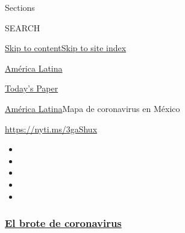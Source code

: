 Sections

SEARCH

\protect\hyperlink{site-content}{Skip to
content}\protect\hyperlink{site-index}{Skip to site index}

\href{https://www.nytimes3xbfgragh.onion/es/section/america-latina}{América
Latina}

\href{https://myaccount.nytimes3xbfgragh.onion/auth/login?response_type=cookie\&client_id=vi}{}

\href{https://www.nytimes3xbfgragh.onion/section/todayspaper}{Today's
Paper}

\href{/es/section/america-latina}{América Latina}\textbar{}Mapa de
coronavirus en México

\url{https://nyti.ms/3gaShux}

\begin{itemize}
\item
\item
\item
\item
\item
\end{itemize}

\hypertarget{el-brote-de-coronavirus}{%
\subsubsection{\texorpdfstring{\href{https://www.nytimes3xbfgragh.onion/es/spotlight/coronavirus?name=styln-coronavirus-es\&region=TOP_BANNER\&block=storyline_menu_recirc\&action=click\&pgtype=Interactive\&impression_id=3e63eb80-efbb-11ea-9dab-d14fdfb8999f\&variant=undefined}{El
brote de
coronavirus}}{El brote de coronavirus}}\label{el-brote-de-coronavirus}}

